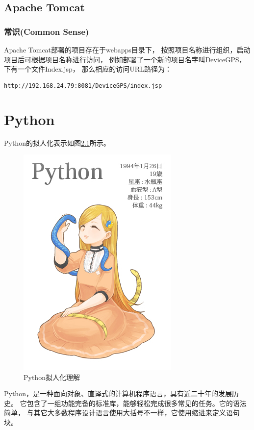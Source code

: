\documentclass{book}
\begin{document}
\section{Apache Tomcat}

\subsection{常识(Common Sense)}

Apache Tomcat部署的项目存在于webapps目录下，
按照项目名称进行组织，启动项目后可根据项目名称进行访问，
例如部署了一个新的项目名字叫DeviceGPS，下有一个文件Index.jsp，
那么相应的访问URL路径为：


\begin{lstlisting}[language=HTML]
http://192.168.24.79:8081/DeviceGPS/index.jsp
\end{lstlisting}

\chapter{Python}

Python的拟人化表示如图\ref{code:PythonVirtual}所示。

\begin{figure}[htbp]
	\centering
	\includegraphics[scale=0.6]{PythonVirtual.jpg}
	\caption{Python拟人化理解}
	\label{code:PythonVirtual}
\end{figure}

Python，是一种面向对象、直译式的计算机程序语言，具有近二十年的发展历史。
它包含了一组功能完备的标准库，能够轻松完成很多常见的任务。它的语法简单，
与其它大多数程序设计语言使用大括号不一样，它使用缩进来定义语句块。
\end{document}
